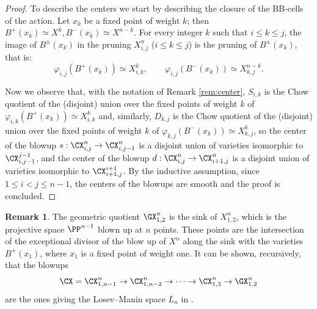 \documentclass[reqno]{amsproc}
\theoremstyle{definition}
\newtheorem{remark}[theorem]{Remark}
\begin{document}
\begin{proof}
To describe the centers we start by describing the closure of the BB-cells of the action. Let $x_k$ be a fixed point of weight $k$; then $B^+(x_k) \simeq X^k, B^-(x_k) \simeq X^{n-k}$.
For every integer $k$ such that $i\le k \le j$, the image of $B^\pm(x_k)$ in the pruning $X^n_{i,j}$ ($i\le k \le j$) is the pruning of $B^\pm(x_k)$,  that is:
\[
 \varphi_{i,j}(B^+(x_k)) \simeq X^{k}_{i,k}, \qquad \varphi_{i,j}(B^-(x_k)) \simeq  X^{n-k}_{k,j}.
\]

Now we observe that, with the notation of Remark \ref{rem:center},  $S_{i,k}$ is the Chow quotient of the (disjoint) union over the fixed points of weight $k$ of $\varphi_{i,k}(B^+(x_k)) \simeq X^k_{i,k}$ and, similarly, $D_{k,j}$ is the Chow quotient of the (disjoint) union over the fixed points of weight $k$ of $\varphi_{k,j}(B^-(x_k)) \simeq X^k_{k,j}$, so the center of the blowup $s:\CX^n_{i,j} \to \CX^n_{i,j-1}$ is  a disjoint union of varieties isomorphic to $\CX^{j-1}_{i,j-1}$, and the center of 
 the blowup $d:\CX^n_{i,j} \to \CX^n_{i+1,j}$ is a disjoint union of varieties isomorphic to $\CX^{i+1}_{i+1,j}$.
By the inductive assumption, since $1 \le i < j \le n-1$, the centers of the blowups are smooth and the proof is concluded.
\end{proof}

\begin{remark} The geometric quotient $\GX^n_{1,2}$ is the sink of $X^n_{1,2}$, which is the projective space $\PP^{n-1}$ blown up at $n$ points. These points are the intersection of the exceptional divisor of the blow up of $X^n$ along the sink with the varieties $B^+(x_1)$, where $x_1$ is a fixed point of weight one.
It can be shown, recursively, that the blowups 
\[\CX=\CX^n_{1,n-1} \to \CX^n_{1,n-2} \to \dots \to \CX^n_{1,3} \to \GX^n_{1,2}\]
are the ones giving the Losev--Manin space $\overline L_n$ in %
\cite[Section~6.1]{Hassett}.
\end{remark}




\end{document}
